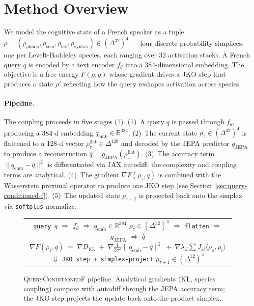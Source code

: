 \section{Method Overview}
\label{sec:method-overview}

We model the cognitive state of a French speaker as a tuple
$\rho = (\rho_{\mathrm{phono}}, \rho_{\mathrm{sem}},
\rho_{\mathrm{lex}}, \rho_{\mathrm{syntax}}) \in (\Delta^{32})^4$
--- four discrete probability simplices, one per Levelt-Baddeley
species, each ranging over 32 activation stacks. A French query
$q$ is encoded by a text encoder $f_\theta$ into a 384-dimensional
embedding. The objective is a free energy $F(\rho, q)$ whose
gradient drives a JKO step that produces a state $\rho'$
reflecting how the query reshapes activation across species.

\paragraph{Pipeline.} The coupling proceeds in five stages
(\cref{fig:pipeline}). (1)~A query $q$ is passed through
$f_\theta$, producing a 384-d embedding
$q_{\mathrm{emb}} \in \mathbb{R}^{384}$. (2)~The current state
$\rho_\tau \in (\Delta^{32})^4$ is flattened to a 128-d vector
$\rho_\tau^{\mathrm{flat}} \in \Delta^{128}$ and decoded by the
JEPA predictor $g_{\mathrm{JEPA}}$ to produce a reconstruction
$\hat{q} = g_{\mathrm{JEPA}}(\rho_\tau^{\mathrm{flat}})$.
(3)~The accuracy term
$\|q_{\mathrm{emb}} - \hat{q}\|^2$ is differentiated via JAX
autodiff; the complexity and coupling terms are analytical.
(4)~The gradient $\nabla F(\rho_\tau, q)$ is combined with the
Wasserstein proximal operator to produce one JKO step (see
Section~\ref{sec:query-conditioned-f}). (5)~The updated state
$\rho_{\tau+1}$ is projected back onto the simplex via
\texttt{softplus}-normalize.

\begin{figure}[t]
  \centering
  \small
  \begin{tabular}{c}
    \fbox{\parbox{0.9\linewidth}{\centering
      \texttt{query $q$} \quad $\Longrightarrow$ \quad
      $f_\theta$ \quad $\Longrightarrow$ \quad
      $q_{\mathrm{emb}} \in \mathbb{R}^{384}$ \\[1ex]
      $\rho_\tau \in (\Delta^{32})^4$ \quad $\Longrightarrow$ \quad
      \texttt{flatten} \quad $\Longrightarrow$ \quad
      $g_{\mathrm{JEPA}}$ \quad $\Longrightarrow$ \quad $\hat{q}$ \\[1ex]
      \bigskip
      $\nabla F(\rho_\tau, q) \;=\;
       \nabla D_{\mathrm{KL}} \;+\;
       \nabla \tfrac{1}{2\sigma^2}\|q_{\mathrm{emb}} - \hat{q}\|^2 \;+\;
       \nabla \lambda_J \sum J_{st}\langle\rho_s, \rho_t\rangle$ \\[1ex]
      $\Downarrow$ \quad \texttt{JKO step + simplex-project} \\[1ex]
      $\rho_{\tau+1} \in (\Delta^{32})^4$
    }}
  \end{tabular}
  \caption{\textsc{QueryConditionedF} pipeline. Analytical
    gradients (KL, species coupling) compose with autodiff
    through the JEPA accuracy term; the JKO step projects the
    update back onto the product simplex.}
  \label{fig:pipeline}
\end{figure}

